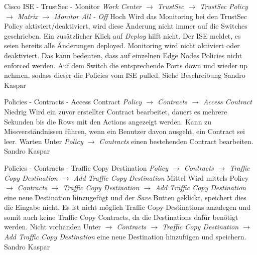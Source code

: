 \bugreport
{Cisco ISE - TrustSec - Monitor}
{\textit{Work Center $\rightarrow$ TrustSec $\rightarrow$ TrustSec Policy $\rightarrow$ Matrix $\rightarrow$ Monitor All - Off}}
{Hoch}
{Wird das Monitoring bei den TrustSec Policy aktiviert/deaktiviert, wird diese Änderung nicht immer auf die Switches geschrieben. Ein zusätzlicher Klick auf \textit{Deploy} hilft nicht. Der ISE meldet, es seien bereits alle Änderungen deployed.}
{Monitoring wird nicht aktiviert oder deaktiviert. Das kann bedeuten, dass auf einzelnen Edge Nodes Policies nicht enforced werden.}
{Auf dem Switch die entsprechende Ports down und wieder up nehmen, sodass dieser die Policies vom ISE pulled.}
{
	Siehe Beschreibung
}
{Sandro Kaspar}
{}


\bugreport
{Policies - Contracts - Access Contract}
{\textit{Policy $\rightarrow$ Contracts $\rightarrow$ Access Contract}}
{Niedrig}
{Wird ein zuvor erstellter Contract bearbeitet, dauert es mehrere Sekunden bis die Rows mit den Actions angezeigt werden.}
{Kann zu Missverständnissen führen, wenn ein Benutzer davon ausgeht, ein Contract sei leer.}
{Warten}
{Unter \textit{Policy $\rightarrow$ Contracts} einen bestehenden Contract bearbeiten.}
{Sandro Kaspar}
{}
	

\bugreport
{Policies - Contracts - Traffic Copy Destination}
{\textit{Policy $\rightarrow$ Contracts $\rightarrow$ Traffic Copy Destination $\rightarrow$ Add Traffic Copy Destination}}
{Mittel}
{Wird mittels Policy \textit{$\rightarrow$ Contracts $\rightarrow$ Traffic Copy Destination $\rightarrow$ Add Traffic Copy Destination} eine neue Destination hinzugefügt und der \textit{Save} Butten geklickt, speichert dies die Eingabe nicht.}
{Es ist nicht möglich Traffic Copy Destinations anzulegen und somit auch keine Traffic Copy Contracts, da die Destinations dafür benötigt werden.}
{Nicht vorhanden}
{Unter \textit{$\rightarrow$ Contracts $\rightarrow$ Traffic Copy Destination $\rightarrow$ Add Traffic Copy Destination} eine neue Destination hinzufügen und speichern.}
{Sandro Kaspar}
{}







